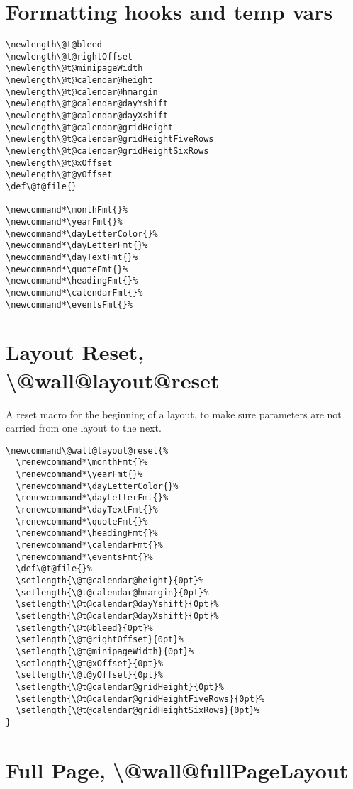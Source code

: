 \documentclass[11pt,oneside]{memoir-article}
\begin{document}
\section{Formatting hooks and temp vars}
\label{sec-10-2}

\begin{verbatim}
\newlength\@t@bleed
\newlength\@t@rightOffset
\newlength\@t@minipageWidth
\newlength\@t@calendar@height
\newlength\@t@calendar@hmargin
\newlength\@t@calendar@dayYshift
\newlength\@t@calendar@dayXshift
\newlength\@t@calendar@gridHeight
\newlength\@t@calendar@gridHeightFiveRows
\newlength\@t@calendar@gridHeightSixRows
\newlength\@t@xOffset
\newlength\@t@yOffset
\def\@t@file{}

\newcommand*\monthFmt{}%
\newcommand*\yearFmt{}%
\newcommand*\dayLetterColor{}%
\newcommand*\dayLetterFmt{}%
\newcommand*\dayTextFmt{}%
\newcommand*\quoteFmt{}%
\newcommand*\headingFmt{}%
\newcommand*\calendarFmt{}%
\newcommand*\eventsFmt{}%
\end{verbatim}

\section{Layout Reset, \textbackslash @wall@layout@reset}
\label{sec-10-3}

A reset macro for the beginning of a layout, to make sure parameters are not
carried from one layout to the next.

\begin{verbatim}
\newcommand\@wall@layout@reset{%
  \renewcommand*\monthFmt{}%
  \renewcommand*\yearFmt{}%
  \renewcommand*\dayLetterColor{}%
  \renewcommand*\dayLetterFmt{}%
  \renewcommand*\dayTextFmt{}%
  \renewcommand*\quoteFmt{}%
  \renewcommand*\headingFmt{}%
  \renewcommand*\calendarFmt{}%
  \renewcommand*\eventsFmt{}%
  \def\@t@file{}%
  \setlength{\@t@calendar@height}{0pt}%
  \setlength{\@t@calendar@hmargin}{0pt}%
  \setlength{\@t@calendar@dayYshift}{0pt}%
  \setlength{\@t@calendar@dayXshift}{0pt}%
  \setlength{\@t@bleed}{0pt}%
  \setlength{\@t@rightOffset}{0pt}%
  \setlength{\@t@minipageWidth}{0pt}%
  \setlength{\@t@xOffset}{0pt}%
  \setlength{\@t@yOffset}{0pt}%
  \setlength{\@t@calendar@gridHeight}{0pt}%
  \setlength{\@t@calendar@gridHeightFiveRows}{0pt}%
  \setlength{\@t@calendar@gridHeightSixRows}{0pt}%
}
\end{verbatim}

\section{Full Page, \textbackslash @wall@fullPageLayout}
\label{sec-10-4}
\end{document}
